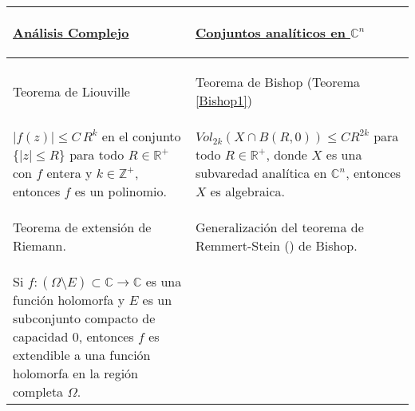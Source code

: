 \documentclass[letterpaper]{report}
\newcommand{\zah}{\ensuremath{ \mathbb Z }}
\newcommand{\co}{\ensuremath{\mathbb C }}
\newcommand{\con}{\ensuremath{\mathbb{C}^n}}
\newcommand{\re}{\ensuremath{\mathbb R }}
\begin{document}
        \begin{tabular}{| m{5.5cm} | m{5.5cm} |} \hline
                        \begin{center} \vspace*{0.2cm} 
                                \underline{\textbf{An\'alisis Complejo}} 
                        \end{center} & 
                        \begin{center} \vspace*{0.2cm}
                                \underline{\textbf{Conjuntos anal\'iticos en $\con$}}
                        \end{center} \\
                \hline
                \begin{center} 
                        Teorema de Liouville 
                \end{center} & 
                \begin{center}
                        Teorema de Bishop (Teorema \ref{Bishop1})
                \end{center}\\ 
                        \hline $\vert f(z)\vert\leq C\,R^k$ en el conjunto $\{\vert z\vert\leq R\}$ 
                        para todo $R\in\re^{+}$con $f$ entera y $k\in\zah^{+}$, entonces 
                        $f$ es un polinomio. 
                        &
                        \vspace{0.1cm}
                        $Vol_{2k}(X\cap B(R,0))\leq CR^{2k}$ para todo
                        $R\in\re^{+}$, donde $X$ es una subvaredad anal\'itica en $\con$, entonces $X$ es algebraica.\\ 
                        \hline
                        \vspace{0.1cm}
                        \begin{center} 
                        Teorema de extensi\'on de Riemann. 
                \end{center} 
                        & 
                \begin{center} 
                        Generalizaci\'on del teorema de Remmert-Stein (\cite{R-S}) de Bishop. 
                \end{center} \\ 
                        \hline Si $f:(\Omega\setminus E)\subset\co\rightarrow\co$ es una funci\'on holomorfa y $E$ es un subconjunto
                        compacto de capacidad $0$, entonces $f$ es extendible a una funci\'on holomorfa
                        en la regi\'on completa $\Omega$.  
                        &


\end{tabular}
\end{document}
